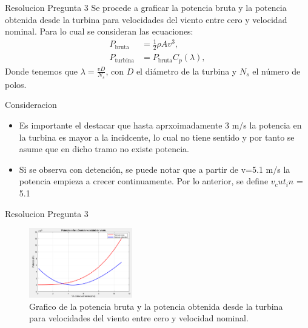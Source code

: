 \documentclass[
    10pt,
    aspectratio=169,
    xcolor={dvipsnames},
    spanish,
    ]{beamer}
\begin{document}
\begin{frame}
  \begin{block}{Resolucion Pregunta 3}
     Se procede a graficar la potencia bruta y la potencia obtenida desde la turbina para velocidades del viento entre cero y velocidad nominal. Para lo cual se consideran las ecuaciones:
    \begin{align}
      P_{\text{bruta}} &= \frac{1}{2} \rho A v^3, \\
      P_{\text{turbina}} &= P_{\text{bruta}} C_p(\lambda),
    \end{align}
    Donde tenemos que \( \lambda = \frac{v D}{N_s} \), con \( D \) el diámetro de la turbina y \( N_s \) el número de polos.
  \end{block}
\end{frame}
\begin{frame}
  \footnotesize
  \begin{alertblock}{Consideracion}
    \begin{itemize}
      \item Es importante el destacar que hasta aprxoimadamente 3 m/s la potencia en la turbina es mayor a la incidcente, lo cual no tiene sentido y por tanto se asume que en dicho tramo no existe potencia.
      \item  Si se observa con detención, se puede notar que a partir de v=5.1 m/s la potencia empieza a crecer continuamente. Por lo anterior, se define $v_cut_in$ = 5.1
    \end{itemize}
  \end{alertblock}
  \begin{block}{Resolucion Pregunta 3}
    \begin{figure}
      \centering
      \includegraphics[width=0.4\textwidth]{Figure_10.png}
      \caption{Grafico de la potencia bruta y la potencia obtenida desde la turbina para velocidades del viento entre cero y velocidad nominal.}
    \end{figure}
  \end{block}
\end{frame}
\end{document}
